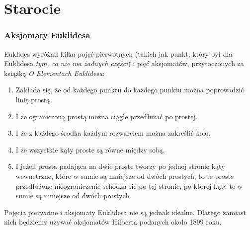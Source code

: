 \chapter{Starocie}

\subsection{Aksjomaty Euklidesa}



{\color{red}
Euklides wyróżnił kilka pojęć pierwotnych (takich jak punkt, który był dla Euklidesa \emph{tym, co nie ma żadnych części}) i pięć aksjomatów, przytoczonych za książką \emph{O Elementach Euklidesa}:

\begin{enumerate}
	\item Zakłada się, że od każdego punktu do każdego punktu można poprowadzić linię prostą.
	\item I że ograniczoną prostą można ciągle przedłużać po prostej.
	\item I że z każdego środka każdym rozwarciem można zakreślić kolo.
	\item I że wszystkie kąty proste są równe między sobą.
	\item I jeżeli prosta padająca na dwie proste tworzy po jednej stronie kąty wewnętrzne, które w sumie są mniejsze od dwóch prostych, to te proste przedłużone nieograniczenie schodzą się po tej stronie, po której kąty te w sumie są mniejsze od dwóch prostych.
\end{enumerate}

Pojęcia pierwotne i aksjomaty Euklidesa nie są jednak idealne.
Dlatego zamiast nich będziemy używać aksjomatów Hilberta podanych około 1899 roku.
}


